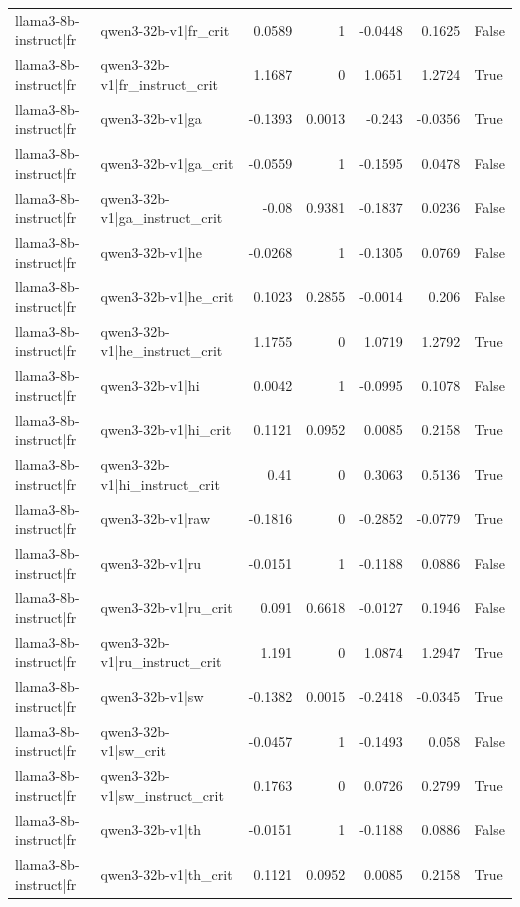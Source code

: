 \begin{table}
\begin{tabular}{l l r r r r l}
llama3-8b-instruct|fr & qwen3-32b-v1|fr_crit & 0.0589 & 1 & -0.0448 & 0.1625 & False \\
llama3-8b-instruct|fr & qwen3-32b-v1|fr_instruct_crit & 1.1687 & 0 & 1.0651 & 1.2724 & True \\
llama3-8b-instruct|fr & qwen3-32b-v1|ga & -0.1393 & 0.0013 & -0.243 & -0.0356 & True \\
llama3-8b-instruct|fr & qwen3-32b-v1|ga_crit & -0.0559 & 1 & -0.1595 & 0.0478 & False \\
llama3-8b-instruct|fr & qwen3-32b-v1|ga_instruct_crit & -0.08 & 0.9381 & -0.1837 & 0.0236 & False \\
llama3-8b-instruct|fr & qwen3-32b-v1|he & -0.0268 & 1 & -0.1305 & 0.0769 & False \\
llama3-8b-instruct|fr & qwen3-32b-v1|he_crit & 0.1023 & 0.2855 & -0.0014 & 0.206 & False \\
llama3-8b-instruct|fr & qwen3-32b-v1|he_instruct_crit & 1.1755 & 0 & 1.0719 & 1.2792 & True \\
llama3-8b-instruct|fr & qwen3-32b-v1|hi & 0.0042 & 1 & -0.0995 & 0.1078 & False \\
llama3-8b-instruct|fr & qwen3-32b-v1|hi_crit & 0.1121 & 0.0952 & 0.0085 & 0.2158 & True \\
llama3-8b-instruct|fr & qwen3-32b-v1|hi_instruct_crit & 0.41 & 0 & 0.3063 & 0.5136 & True \\
llama3-8b-instruct|fr & qwen3-32b-v1|raw & -0.1816 & 0 & -0.2852 & -0.0779 & True \\
llama3-8b-instruct|fr & qwen3-32b-v1|ru & -0.0151 & 1 & -0.1188 & 0.0886 & False \\
llama3-8b-instruct|fr & qwen3-32b-v1|ru_crit & 0.091 & 0.6618 & -0.0127 & 0.1946 & False \\
llama3-8b-instruct|fr & qwen3-32b-v1|ru_instruct_crit & 1.191 & 0 & 1.0874 & 1.2947 & True \\
llama3-8b-instruct|fr & qwen3-32b-v1|sw & -0.1382 & 0.0015 & -0.2418 & -0.0345 & True \\
llama3-8b-instruct|fr & qwen3-32b-v1|sw_crit & -0.0457 & 1 & -0.1493 & 0.058 & False \\
llama3-8b-instruct|fr & qwen3-32b-v1|sw_instruct_crit & 0.1763 & 0 & 0.0726 & 0.2799 & True \\
llama3-8b-instruct|fr & qwen3-32b-v1|th & -0.0151 & 1 & -0.1188 & 0.0886 & False \\
llama3-8b-instruct|fr & qwen3-32b-v1|th_crit & 0.1121 & 0.0952 & 0.0085 & 0.2158 & True \\

\end{tabular}
\end{table}
